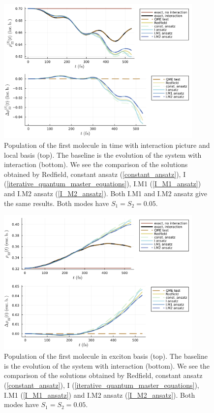 \newpage
\begin{figure}[H]
\centering
\includegraphics[width=0.9\textwidth]{img/ansatz/iterative01_joined_intloc22.png}
\caption{Population of the first molecule in time with interaction picture and local basis (top). The baseline is the evolution of the system with interaction (bottom). We see the comparison of the solutions obtained by Redfield, constant ansatz (\ref{constant_ansatz}), I (\ref{iterative_quantum_master_equations}), I.M1 (\ref{I_M1_ansatz}) and I.M2 ansatz (\ref{I_M2_ansatz}). Both I.M1 and I.M2 ansatz give the same results. Both modes have $S_1=S_2=0.05$.}
\label{img:iterative01_joined_intloc22}
\end{figure}

\begin{figure}[H]
\centering
\includegraphics[width=0.9\textwidth]{img/ansatz/iterative01_joined_schexc22.png}
\caption{Population of the first molecule in exciton basis (top). The baseline is the evolution of the system with interaction (bottom). We see the comparison of the solutions obtained by Redfield, constant ansatz (\ref{constant_ansatz}), I (\ref{iterative_quantum_master_equations}), I.M1 (\ref{I_M1_ansatz}) and I.M2 ansatz (\ref{I_M2_ansatz}). Both modes have $S_1=S_2=0.05$.}
\label{img:iterative01_joined_schexc22}
\end{figure}

